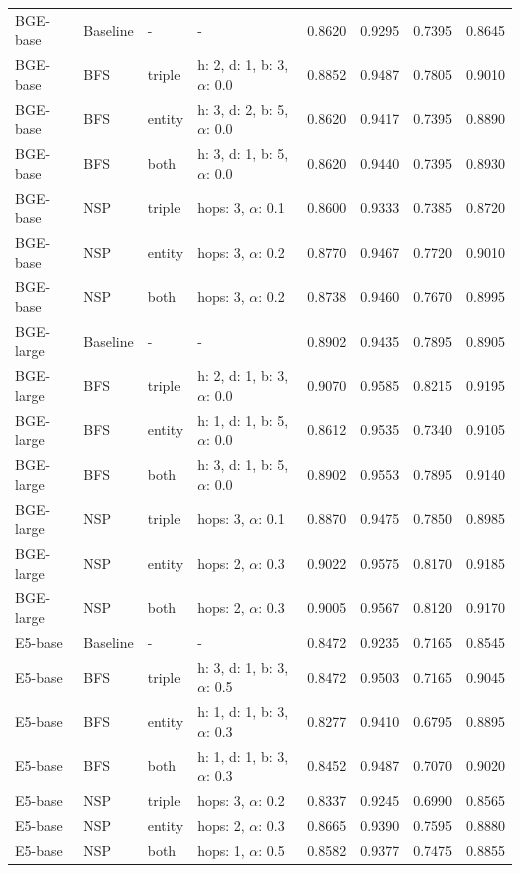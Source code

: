 \documentclass[11pt]{article}
\begin{document}
\begin{table}[t]
\begin{tabular}{llllcccc}
BGE-base & Baseline & - & - & 0.8620 & 0.9295 & 0.7395 & 0.8645 \\
BGE-base & BFS & triple & h: 2, d: 1, b: 3, $\alpha$: 0.0 & 0.8852 & 0.9487 & 0.7805 & 0.9010 \\
BGE-base & BFS & entity & h: 3, d: 2, b: 5, $\alpha$: 0.0 & 0.8620 & 0.9417 & 0.7395 & 0.8890 \\
BGE-base & BFS & both & h: 3, d: 1, b: 5, $\alpha$: 0.0 & 0.8620 & 0.9440 & 0.7395 & 0.8930 \\
BGE-base & NSP & triple & hops: 3, $\alpha$: 0.1 & 0.8600 & 0.9333 & 0.7385 & 0.8720 \\
BGE-base & NSP & entity & hops: 3, $\alpha$: 0.2 & 0.8770 & 0.9467 & 0.7720 & 0.9010 \\
BGE-base & NSP & both & hops: 3, $\alpha$: 0.2 & 0.8738 & 0.9460 & 0.7670 & 0.8995 \\

BGE-large & Baseline & - & - & 0.8902 & 0.9435 & 0.7895 & 0.8905 \\
BGE-large & BFS & triple & h: 2, d: 1, b: 3, $\alpha$: 0.0 & 0.9070 & 0.9585 & 0.8215 & 0.9195 \\
BGE-large & BFS & entity & h: 1, d: 1, b: 5, $\alpha$: 0.0 & 0.8612 & 0.9535 & 0.7340 & 0.9105 \\
BGE-large & BFS & both & h: 3, d: 1, b: 5, $\alpha$: 0.0 & 0.8902 & 0.9553 & 0.7895 & 0.9140 \\
BGE-large & NSP & triple & hops: 3, $\alpha$: 0.1 & 0.8870 & 0.9475 & 0.7850 & 0.8985 \\
BGE-large & NSP & entity & hops: 2, $\alpha$: 0.3 & 0.9022 & 0.9575 & 0.8170 & 0.9185 \\
BGE-large & NSP & both & hops: 2, $\alpha$: 0.3 & 0.9005 & 0.9567 & 0.8120 & 0.9170 \\

E5-base & Baseline & - & - & 0.8472 & 0.9235 & 0.7165 & 0.8545 \\
E5-base & BFS & triple & h: 3, d: 1, b: 3, $\alpha$: 0.5 & 0.8472 & 0.9503 & 0.7165 & 0.9045 \\
E5-base & BFS & entity & h: 1, d: 1, b: 3, $\alpha$: 0.3 & 0.8277 & 0.9410 & 0.6795 & 0.8895 \\
E5-base & BFS & both & h: 1, d: 1, b: 3, $\alpha$: 0.3 & 0.8452 & 0.9487 & 0.7070 & 0.9020 \\
E5-base & NSP & triple & hops: 3, $\alpha$: 0.2 & 0.8337 & 0.9245 & 0.6990 & 0.8565 \\
E5-base & NSP & entity & hops: 2, $\alpha$: 0.3 & 0.8665 & 0.9390 & 0.7595 & 0.8880 \\
E5-base & NSP & both & hops: 1, $\alpha$: 0.5 & 0.8582 & 0.9377 & 0.7475 & 0.8855 \\


\end{tabular}
\end{table}
\end{document}
